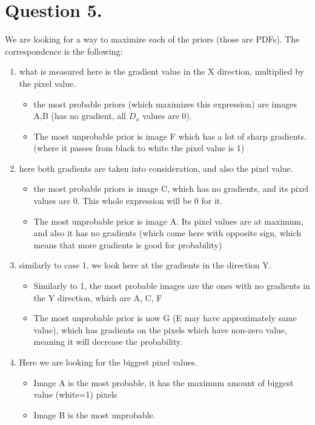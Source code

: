 \documentclass[a4paper]{iacas}
\begin{document}
\section{Question 5.}
We are looking for a way to maximize each of the priors (those are PDFs).
\newline
The correspondence is the following:
\begin{enumerate}
\item what is measured here is the gradient value in the X direction, multiplied by the pixel value. 
	\begin{itemize}
	\item the most probable priors (which maximizes this expression) are images A,B (has no gradient, all $D_x$ values are 0). 
	\item The most unprobable prior is image F which has a lot of sharp gradients. (where it passes from black to white the pixel value is 1)
	\end{itemize}
\item here both gradients are taken into consideration, and also the pixel value.
	\begin{itemize}
	\item the most probable priors is image C, which has no gradients, and its pixel values are 0. This whole expression will be 0 for it.
	\item The most unprobable prior is image A. Its pixel values are at maximum, and also it has no gradients (which come here with opposite sign, which means that more gradients is good for probability)
	\end{itemize}
\item similarly to case 1, we look here at the gradients in the direction Y.
	\begin{itemize}
	\item Similarly to 1, the most probable images are the ones with no gradients in the Y direction, which are A, C, F
	\item The most unprobable prior is now G (E may have approximately same value), which has gradients on the pixels which have non-zero value, meaning it will decrease the probability.
	\end{itemize}
\item Here we are looking for the biggest pixel values.
	\begin{itemize}
	\item Image A is the most probable, it has the maximum amount of biggest value (white=1) pixels
	\item Image B is the most unprobable.
	\end{itemize}
\end{enumerate}
\end{document}
